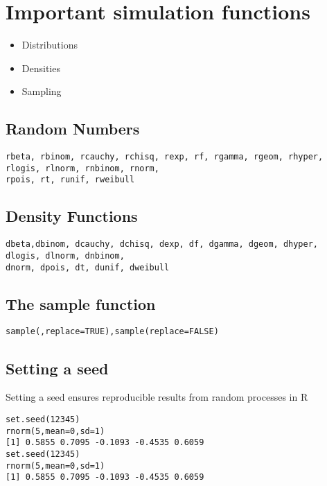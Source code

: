 \section{Important simulation functions}
\begin{itemize}
\item Distributions
\item Densities
\item Sampling
\end{itemize}
\subsection{Random Numbers}

\begin{verbatim}
rbeta, rbinom, rcauchy, rchisq, rexp, rf, rgamma, rgeom, rhyper, rlogis, rlnorm, rnbinom, rnorm,
rpois, rt, runif, rweibull
\end{verbatim}
\subsection{Density Functions}

\begin{verbatim}
dbeta,dbinom, dcauchy, dchisq, dexp, df, dgamma, dgeom, dhyper, dlogis, dlnorm, dnbinom,
dnorm, dpois, dt, dunif, dweibull
\end{verbatim}
\subsection{The sample function}

\texttt{sample(,replace=TRUE),sample(replace=FALSE)}


\subsection{Setting a seed}
Setting a seed ensures reproducible results from random processes in R
\begin{verbatim}
set.seed(12345)
rnorm(5,mean=0,sd=1)
[1] 0.5855 0.7095 -0.1093 -0.4535 0.6059
set.seed(12345)
rnorm(5,mean=0,sd=1)
[1] 0.5855 0.7095 -0.1093 -0.4535 0.6059
\end{verbatim}
